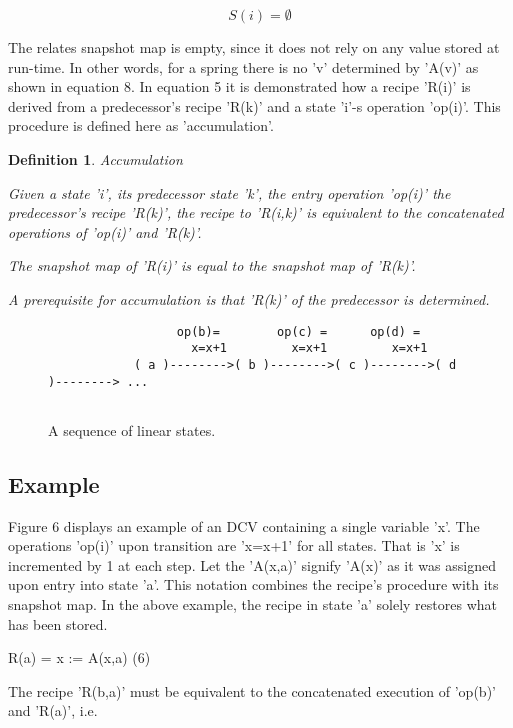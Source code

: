 \documentclass[12pt]{article}
\newtheorem{definition}{Definition}
\begin{document}
\begin{equation}
                          S(i) = \emptyset
\end{equation}

The relates snapshot map is empty, since it does not rely on any value stored
at run-time.  In other words, for a spring there is no 'v' determined by 'A(v)'
as shown in equation 8.  In equation 5 it is demonstrated how a recipe 'R(i)'
is derived from a predecessor's recipe 'R(k)' and a state 'i'-s operation
'op(i)'. This procedure is defined here as 'accumulation'.

\begin{definition}
Accumulation

Given a state 'i', its predecessor state 'k', the entry operation 'op(i)'
the predecessor's recipe 'R(k)', the recipe to 'R(i,k)' is equivalent
to the concatenated operations of 'op(i)' and 'R(k)'.

The snapshot map of 'R(i)' is equal to the snapshot map of 'R(k)'.

A prerequisite for accumulation is that 'R(k)' of the predecessor is 
determined.
\end{definition}

\begin{figure}[htbp] \leavevmode
\begin{verbatim}
                  op(b)=        op(c) =      op(d) =
                    x=x+1         x=x+1         x=x+1        
            ( a )-------->( b )-------->( c )-------->( d )--------> ...


\end{verbatim}
\caption{A sequence of linear states.}
\end{figure}

\subsection{Example}

Figure 6 displays an example of an DCV containing a single variable 'x'. The
operations 'op(i)' upon transition are 'x=x+1' for all states. That is 'x' is
incremented by 1 at each step. Let the 'A(x,a)' signify 'A(x)' as it was
assigned upon entry into state 'a'. This notation combines the recipe's
procedure with its snapshot map. In the above example, the recipe in state 'a'
solely restores what has been stored.

               R(a) = { x := A(x,a) }                                     (6)

The recipe 'R(b,a)' must be equivalent to the concatenated execution of 'op(b)'
and 'R(a)', i.e.
\end{document}
